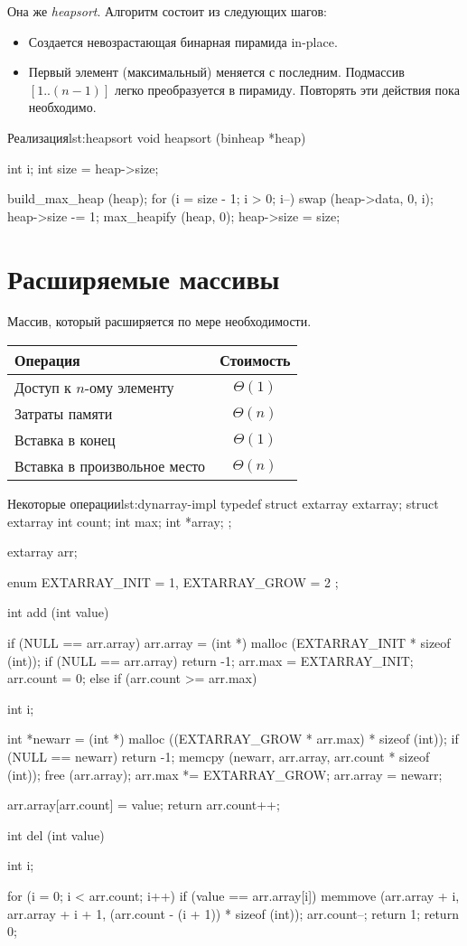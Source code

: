Она же \emph{heapsort}. Алгоритм состоит из следующих шагов:
\begin{itemize}
  \item Создается невозрастающая бинарная пирамида in-place.
  \item Первый элемент (максимальный) меняется с последним. Подмассив $[1..(n - 1)]$ легко преобразуется в пирамиду. Повторять эти действия пока необходимо.
\end{itemize}

\begin{clst}{Реализация}{lst:heapsort}
void heapsort (binheap *heap) {
  int i;
  int size = heap->size;

  build_max_heap (heap);
  for (i = size - 1; i > 0; i--) {
    swap (heap->data, 0, i);
    heap->size -= 1;
    max_heapify (heap, 0);
  }
  heap->size = size;
}
\end{clst}

\section{Расширяемые массивы}
\label{sec:ext-arrays}

Массив, который расширяется по мере необходимости.
\begin{center}
  \begin{tabular}{lc}
    \toprule
    Операция & Стоимость \\
    \midrule
    Доступ к $n$-ому элементу & $\Theta(1)$ \\
    Затраты памяти & $\Theta(n)$ \\
    Вставка в конец & $\Theta(1)$ \\
    Вставка в произвольное место & $\Theta(n)$ \\
    \bottomrule
  \end{tabular}
\end{center}

\begin{clst}{Некоторые операции}{lst:dynarray-impl}
typedef struct extarray extarray;
struct extarray {
  int count;
  int max;
  int *array;
};

extarray arr;

enum { EXTARRAY_INIT = 1,
       EXTARRAY_GROW = 2 };

int add (int value) {
  if (NULL == arr.array) {
    arr.array = (int *) malloc (EXTARRAY_INIT * sizeof (int));
    if (NULL == arr.array)
      return -1;
    arr.max = EXTARRAY_INIT;
    arr.count = 0;
  } else if (arr.count >= arr.max) {
    int i;

    int *newarr = (int *) malloc ((EXTARRAY_GROW * arr.max) * sizeof (int));
    if (NULL == newarr)
      return -1;
    memcpy (newarr, arr.array, arr.count * sizeof (int));
    free (arr.array);
    arr.max *= EXTARRAY_GROW;
    arr.array = newarr;
  }
  arr.array[arr.count] = value;
  return arr.count++;
}

int del (int value) {
  int i;

  for (i = 0; i < arr.count; i++)
    if (value == arr.array[i]) {
      memmove (arr.array + i, arr.array + i + 1,
	       (arr.count - (i + 1)) * sizeof (int));
      arr.count--;
      return 1;
    }
  return 0;
}
\end{clst}

